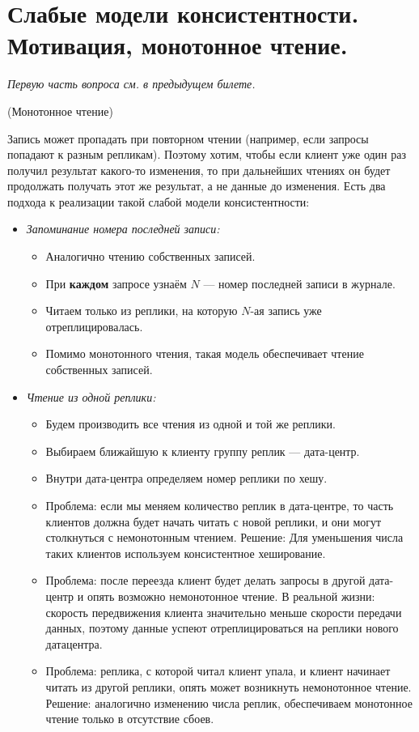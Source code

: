 \section{Слабые модели консистентности. Мотивация, монотонное чтение.}

\textit{Первую часть вопроса см. в предыдущем билете.}

\begin{example}(Монотонное чтение)

    Запись может пропадать при повторном чтении (например, если запросы попадают к разным репликам). Поэтому хотим, чтобы если клиент уже один раз получил результат какого-то изменения, то при дальнейших чтениях он будет продолжать получать этот же результат, а не данные до изменения. Есть два подхода к реализации такой слабой модели консистентности:
    \begin{itemize}
        \item \textit{Запоминание номера последней записи:}
        \begin{itemize}
            \item Аналогично чтению собственных записей.
            \item При \textbf{каждом} запросе узнаём $N$ --- номер последней записи в журнале.
            \item Читаем только из реплики, на которую $N$-ая запись уже отреплицировалась.
            \item Помимо монотонного чтения, такая модель обеспечивает чтение собственных записей.
        \end{itemize}

        \item \textit{Чтение из одной реплики:}
        \begin{itemize}
            \item Будем производить все чтения из одной и той же реплики.
            \item Выбираем ближайшую к клиенту группу реплик --- дата-центр.
            \item Внутри дата-центра определяем номер реплики по хешу.
            \item Проблема: если мы меняем количество реплик в дата-центре, то часть клиентов должна будет начать читать с новой реплики, и они могут столкнуться с немонотонным чтением. Решение: Для уменьшения числа таких клиентов используем консистентное хеширование.
            \item Проблема: после переезда клиент будет делать запросы в другой дата-центр и опять возможно немонотонное чтение. В реальной жизни: скорость передвижения клиента значительно меньше скорости передачи данных, поэтому данные успеют отреплицироваться на реплики нового датацентра.
            \item Проблема: реплика, с которой читал клиент упала, и клиент начинает читать из другой реплики, опять может возникнуть немонотонное чтение. Решение: аналогично изменению числа реплик, обеспечиваем монотонное чтение только в отсутствие сбоев.
        \end{itemize}
    \end{itemize}

\end{example}
